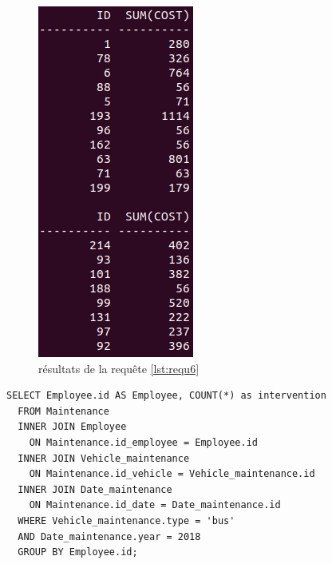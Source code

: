 \documentclass[a4paper,12pt]{report}
\begin{document}
\begin{figure}[!ht]
  \centering
  \includegraphics[scale=0.5]{images/requetes_analytiques/requ6.png}
  \caption{résultats de la requête \ref{lst:requ6}}
\end{figure}

\begin{lstlisting}[caption={le nombre total de maintenances effectuées sur les bus par employé pour l'année 2018}, label={lst:requ7}]
  SELECT Employee.id AS Employee, COUNT(*) as intervention
  FROM Maintenance
  INNER JOIN Employee
    ON Maintenance.id_employee = Employee.id
  INNER JOIN Vehicle_maintenance
    ON Maintenance.id_vehicle = Vehicle_maintenance.id
  INNER JOIN Date_maintenance
    ON Maintenance.id_date = Date_maintenance.id
  WHERE Vehicle_maintenance.type = 'bus'
  AND Date_maintenance.year = 2018
  GROUP BY Employee.id;
\end{lstlisting}
\end{document}
